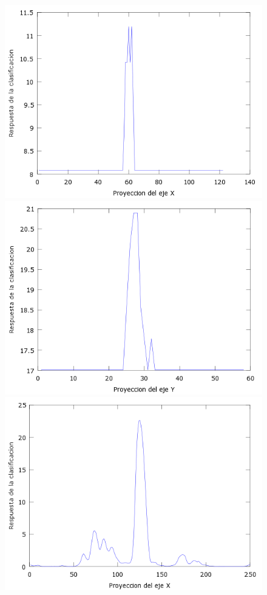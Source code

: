 \begin{figure}[H]
  \centering
  \includegraphics[scale=.4]{images/plots/boost8X}
  \includegraphics[scale=.4]{images/plots/boost8Y}
  \includegraphics[scale=.4]{images/plots/svm8X}

\end{figure}
